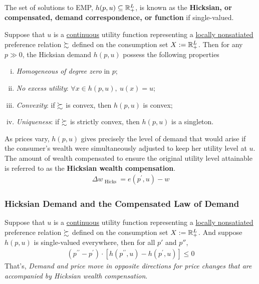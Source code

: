 \documentclass{report}
\begin{document}
 			\begin{definition}
 				The set of solutions to EMP, $h(p, u) \subseteq \mathbb{R}^L_+$, is known as the \textbf{Hicksian, or compensated, demand correspondence, or function} if single-valued.
 			\end{definition}
 			
 			\begin{proposition}[3.E.3]
 				Suppose that $u$ is a \ul{continuous} utility function representing a \ul{locally nonsatiated} preference relation $\succsim$ defined on the consumption set $X := \mathbb{R}^L_+$. Then for any $p \gg 0$, the Hicksian demand $h(p, u)$ possess the following properties
 				\begin{enumerate}[(i)]
 					\item \emph{Homogeneous of degree zero} in $p$;
 					\item \emph{No excess utility}: $\forall x \in h(p, u),\ u(x) = u$;
 					\item \emph{Convexity}: if $\succsim$ is convex, then $h(p, u)$ is convex;
 					\item \emph{Uniqueness}: if $\succsim$ is strictly convex, then $h(p, u)$ is a singleton.
 				\end{enumerate}
 			\end{proposition}
 			
 			\begin{definition}
 				As prices vary, $h(p, u)$ gives precisely the level of demand that would arise if the consumer's wealth were simultaneously adjusted to keep her utility level at $u$. The amount of wealth compensated to ensure the original utility level attainable is referred to as the \textbf{Hicksian wealth compensation}.
 				\begin{align}
 					\Delta w_{\text { Hicks }}=e\left(p^{\prime}, u\right)-w
 				\end{align}
 			\end{definition}
 			
 			\subsubsection{Hicksian Demand and the Compensated Law of Demand}
 			
 			\begin{proposition}
 				Suppose that $u$ is a \ul{continuous} utility function representing a \ul{locally nonsatiated} preference relation $\succsim$ defined on the consumption set $X := \mathbb{R}^L_+$. And suppose $h(p, u)$ is single-valued everywhere, then for all $p'$ and $p''$,
 				\begin{align}
 					\left(p^{\prime \prime}-p^{\prime}\right) \cdot\left[h\left(p^{\prime \prime}, u\right)-h\left(p^{\prime}, u\right)\right] \leq 0
 				\end{align}
 				That's, \emph{Demand and price move in opposite directions for price changes that are accompanied by Hicksian wealth compensation}.
 			\end{proposition}
 			
\end{document}
